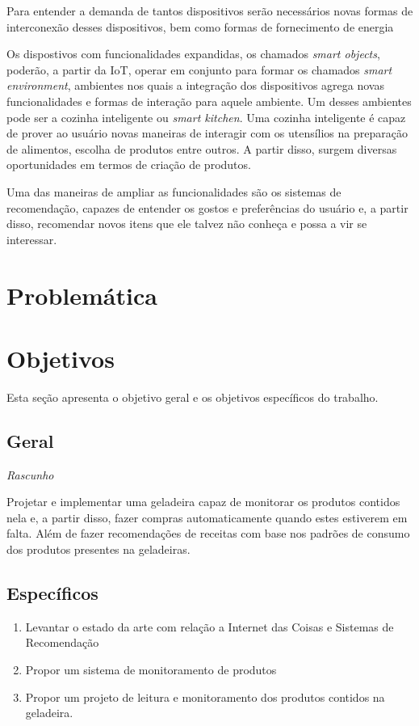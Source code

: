 Para entender a demanda de tantos dispositivos serão necessários novas formas de interconexão desses dispositivos, bem como formas de fornecimento de energia


Os dispostivos com funcionalidades expandidas, os chamados \textit{smart objects}, poderão, a partir da IoT, operar em conjunto para formar os chamados \textit{smart environment}, ambientes nos quais a integração dos dispositivos agrega novas funcionalidades e formas de interação para aquele ambiente. Um desses ambientes pode ser a cozinha inteligente ou \textit{smart kitchen}. Uma cozinha inteligente é capaz de prover ao usuário novas maneiras de interagir com os utensílios na preparação de alimentos, escolha de produtos entre outros. A partir disso, surgem diversas oportunidades em termos de criação de produtos.

Uma das maneiras de ampliar as funcionalidades são os sistemas de recomendação, capazes de entender os gostos e preferências do usuário e, a partir disso, recomendar novos itens que ele talvez não conheça e possa a vir se interessar.

\section{Problemática}


\section{Objetivos}
Esta seção apresenta o objetivo geral e os objetivos específicos do trabalho.

\subsection{Geral}

\textit{Rascunho}

Projetar e implementar uma geladeira capaz de monitorar os produtos contidos nela e, a partir disso, fazer compras automaticamente quando estes estiverem em falta.
Além de fazer recomendações de receitas com base nos padrões de consumo dos produtos presentes na geladeiras.


\subsection{Específicos}
\begin{enumerate}
	\item Levantar o estado da arte com relação a Internet das Coisas e Sistemas de Recomendação
	\item Propor um sistema de monitoramento de produtos 
	\item Propor um projeto de leitura e monitoramento dos produtos contidos na geladeira.
\end{enumerate}

